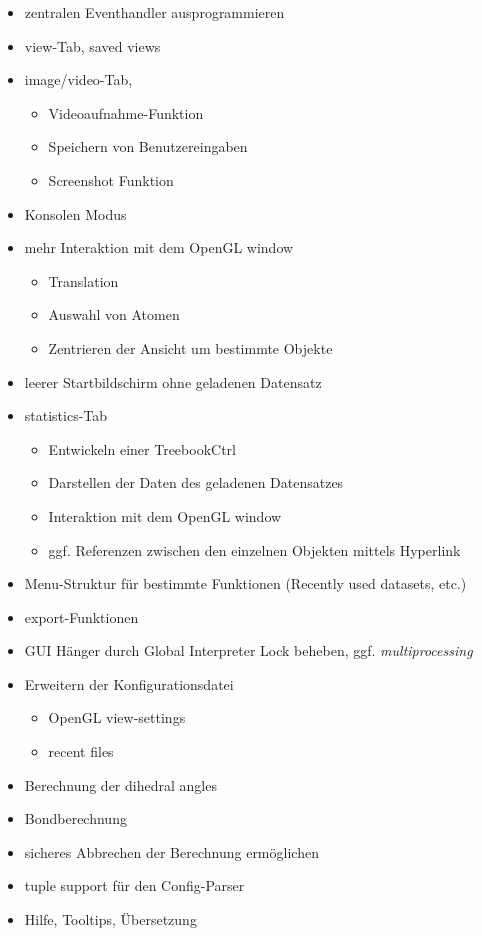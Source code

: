 \thispagestyle{empty}
\begin{itemize}
\item zentralen Eventhandler ausprogrammieren
\item view-Tab, saved views
\item image/video-Tab,
\begin{itemize}
	\item Videoaufnahme-Funktion
	\item Speichern von Benutzereingaben
	\item Screenshot Funktion
\end{itemize}
\item Konsolen Modus
\item mehr Interaktion mit dem OpenGL window
\begin{itemize}
	\item Translation
	\item Auswahl von Atomen
	\item Zentrieren der Ansicht um bestimmte Objekte
\end{itemize}
\item leerer Startbildschirm ohne geladenen Datensatz
\item statistics-Tab
\begin{itemize}
	\item Entwickeln einer TreebookCtrl
	\item Darstellen der Daten des geladenen Datensatzes
	\item Interaktion mit dem OpenGL window
	\item ggf. Referenzen zwischen den einzelnen Objekten mittels Hyperlink
\end{itemize}
\item Menu-Struktur für bestimmte Funktionen (Recently used datasets, etc.)
\item export-Funktionen
\item GUI Hänger durch Global Interpreter Lock beheben, ggf. \textit{multiprocessing}
\item Erweitern der Konfigurationsdatei
\begin{itemize}
	\item OpenGL view-settings
	\item recent files
\end{itemize}
\item Berechnung der dihedral angles
\item Bondberechnung
\item sicheres Abbrechen der Berechnung ermöglichen
\item tuple support für den Config-Parser
\item Hilfe, Tooltips, Übersetzung
\end{itemize}
\clearpage

